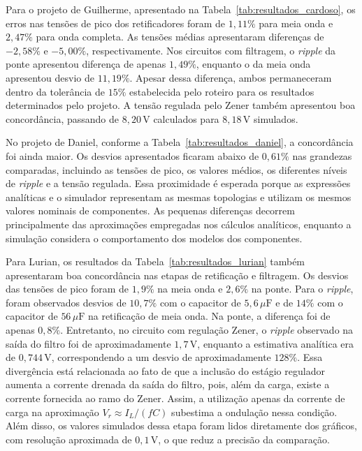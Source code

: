 \documentclass[11pt,a4paper]{article}
\begin{document}
Para o projeto de Guilherme, apresentado na Tabela~\ref{tab:resultados_cardoso}, os erros nas tensões de pico dos retificadores foram de $1{,}11\%$ para meia onda e $2{,}47\%$ para onda completa. As tensões médias apresentaram diferenças de $-2{,}58\%$ e $-5{,}00\%$, respectivamente. Nos circuitos com filtragem, o \textit{ripple} da ponte apresentou diferença de apenas $1{,}49\%$, enquanto o da meia onda apresentou desvio de $11{,}19\%$. Apesar dessa diferença, ambos permaneceram dentro da tolerância de $15\%$ estabelecida pelo roteiro para os resultados determinados pelo projeto. A tensão regulada pelo Zener também apresentou boa concordância, passando de $8{,}20\,\text{V}$ calculados para $8{,}18\,\text{V}$ simulados.

No projeto de Daniel, conforme a Tabela~\ref{tab:resultados_daniel}, a concordância foi ainda maior. Os desvios apresentados ficaram abaixo de $0{,}61\%$ nas grandezas comparadas, incluindo as tensões de pico, os valores médios, os diferentes níveis de \textit{ripple} e a tensão regulada. Essa proximidade é esperada porque as expressões analíticas e o simulador representam as mesmas topologias e utilizam os mesmos valores nominais de componentes. As pequenas diferenças decorrem principalmente das aproximações empregadas nos cálculos analíticos, enquanto a simulação considera o comportamento dos modelos dos componentes.

Para Lurian, os resultados da Tabela~\ref{tab:resultados_lurian} também apresentaram boa concordância nas etapas de retificação e filtragem. Os desvios das tensões de pico foram de $1{,}9\%$ na meia onda e $2{,}6\%$ na ponte. Para o \textit{ripple}, foram observados desvios de $10{,}7\%$ com o capacitor de $5{,}6\,\mu\text{F}$ e de $14\%$ com o capacitor de $56\,\mu\text{F}$ na retificação de meia onda. Na ponte, a diferença foi de apenas $0{,}8\%$. Entretanto, no circuito com regulação Zener, o \textit{ripple} observado na saída do filtro foi de aproximadamente $1{,}7\,\text{V}$, enquanto a estimativa analítica era de $0{,}744\,\text{V}$, correspondendo a um desvio de aproximadamente $128\%$. Essa divergência está relacionada ao fato de que a inclusão do estágio regulador aumenta a corrente drenada da saída do filtro, pois, além da carga, existe a corrente fornecida ao ramo do Zener. Assim, a utilização apenas da corrente de carga na aproximação $V_r \approx I_L/(fC)$ subestima a ondulação nessa condição. Além disso, os valores simulados dessa etapa foram lidos diretamente dos gráficos, com resolução aproximada de $0{,}1\,\text{V}$, o que reduz a precisão da comparação.
\end{document}
